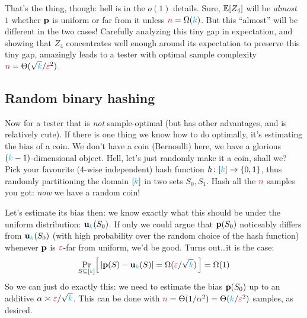 That's the thing, though: hell is in the $o(1)$ details. Sure, $\expect{Z_4}$ will be \emph{almost} $1$ whether $\mathbf{p}$ is uniform or far from it unless ${\textcolor{purple}{n}} = \Omega({\textcolor{cyan}{k}})$. But this ``almost'' will be different in the two cases! Carefully analyzing this tiny gap in expectation, and showing that $Z_4$ concentrates well enough around its expectation to preserve this tiny gap, amazingly leads to a tester with optimal sample complexity ${\textcolor{purple}{n}} = \Theta(\sqrt{{\textcolor{cyan}{k}}}/\textcolor{red}{\varepsilon}^2)$.

\subsection{Random binary hashing} Now for a tester that is \emph{not} sample-optimal (but has other advantages, and is relatively cute). If there is one thing we know how to do optimally, it's estimating the bias of a coin. We don't have a coin (Bernoulli) here, we have a glorious $({\textcolor{cyan}{k}}-1)$-dimensional object.
Hell, let's just randomly make it a coin, shall we? Pick your favourite ($4$-wise independent) hash function $h\colon[{\textcolor{cyan}{k}}]\to\{0,1\}$, thus randomly partitioning the domain $[{\textcolor{cyan}{k}}]$ in two sets $S_0,S_1$. Hash all the ${\textcolor{purple}{n}}$ samples you got: \emph{now} we have a random coin!

Let's estimate its bias then: we know exactly what this should be under the uniform distribution: $\mathbf{u}_{\textcolor{cyan}{k}}(S_0)$. If only we could argue that $\mathbf{p}(S_0)$ noticeably differs from $\mathbf{u}_{\textcolor{cyan}{k}}(S_0)$ (with high probability over the random choice of the hash function) whenever $\mathbf{p}$ is $\textcolor{red}{\varepsilon}$-far from uniform, we'd be good. Turns out\dots it is the case:
\begin{equation}
    \probaDistrOf{S\subseteq [\ab]}{ |\p(S)-\uniform_\ab(S)| = \Omega(\dst/\sqrt{\ab}) } = \Omega(1)
\end{equation}
So we can just do exactly this: we need to estimate the bias $\mathbf{p}(S_0)$ up to an additive $\alpha \asymp \textcolor{red}{\varepsilon}/\sqrt{{\textcolor{cyan}{k}}}$. This can be done with ${\textcolor{purple}{n}} = \Theta(1/\alpha^2)= \Theta({\textcolor{cyan}{k}}/\textcolor{red}{\varepsilon}^2)$ samples, as desired.

